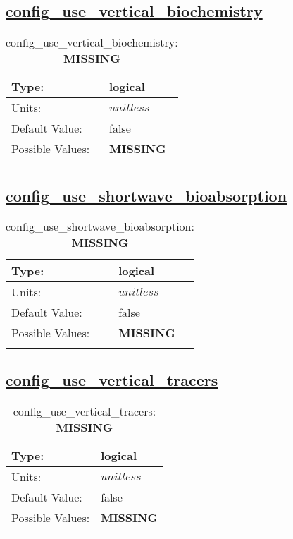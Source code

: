 \subsection[config\_use\_vertical\_biochemistry]{\hyperref[sec:nm_tab_biogeochemistry]{config\_use\_vertical\_biochemistry}}
\label{subsec:nm_sec_config_use_vertical_biochemistry}
\begin{center}
\begin{longtable}{| p{2.0in} || p{4.0in} |}
    \hline
    Type: & logical \\
    \hline
    Units: & $unitless$ \\
    \hline
    Default Value: & false \\
    \hline
    Possible Values: & {\bf \color{red} MISSING} \\
    \hline
    \caption{config\_use\_vertical\_biochemistry: {\bf \color{red} MISSING}}
\end{longtable}
\end{center}
\subsection[config\_use\_shortwave\_bioabsorption]{\hyperref[sec:nm_tab_biogeochemistry]{config\_use\_shortwave\_bioabsorption}}
\label{subsec:nm_sec_config_use_shortwave_bioabsorption}
\begin{center}
\begin{longtable}{| p{2.0in} || p{4.0in} |}
    \hline
    Type: & logical \\
    \hline
    Units: & $unitless$ \\
    \hline
    Default Value: & false \\
    \hline
    Possible Values: & {\bf \color{red} MISSING} \\
    \hline
    \caption{config\_use\_shortwave\_bioabsorption: {\bf \color{red} MISSING}}
\end{longtable}
\end{center}
\subsection[config\_use\_vertical\_tracers]{\hyperref[sec:nm_tab_biogeochemistry]{config\_use\_vertical\_tracers}}
\label{subsec:nm_sec_config_use_vertical_tracers}
\begin{center}
\begin{longtable}{| p{2.0in} || p{4.0in} |}
    \hline
    Type: & logical \\
    \hline
    Units: & $unitless$ \\
    \hline
    Default Value: & false \\
    \hline
    Possible Values: & {\bf \color{red} MISSING} \\
    \hline
    \caption{config\_use\_vertical\_tracers: {\bf \color{red} MISSING}}
\end{longtable}
\end{center}
